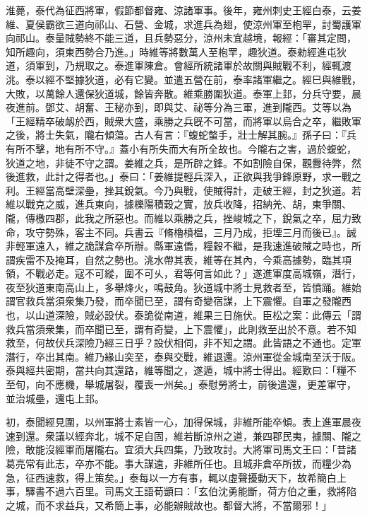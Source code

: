 \begin{pinyinscope}
淮薨，泰代為征西將軍，假節都督雍、涼諸軍事。後年，雍州刺史王經白泰，云姜維、夏侯霸欲三道向祁山、石營、金城，求進兵為翅，使涼州軍至枹䍐，討蜀護軍向祁山。泰量賊勢終不能三道，且兵勢惡分，涼州未宜越境，報經：「審其定問，知所趣向，須東西勢合乃進。」時維等將數萬人至枹䍐，趣狄道。泰勑經進屯狄道，須軍到，乃規取之。泰進軍陳倉。會經所統諸軍於故關與賊戰不利，經輒渡洮。泰以經不堅據狄道，必有它變。並遣五營在前，泰率諸軍繼之。經巳與維戰，大敗，以萬餘人還保狄道城，餘皆奔散。維乘勝圍狄道。泰軍上邽，分兵守要，晨夜進前。鄧艾、胡奮、王秘亦到，即與艾、祕等分為三軍，進到隴西。艾等以為「王經精卒破衂於西，賊衆大盛，乘勝之兵旣不可當，而將軍以烏合之卒，繼敗軍之後，將士失氣，隴右傾蕩。古人有言：『蝮蛇螫手，壯士解其腕。』孫子曰：『兵有所不擊，地有所不守。』蓋小有所失而大有所全故也。今隴右之害，過於蝮蛇，狄道之地，非徒不守之謂。姜維之兵，是所辟之鋒。不如割險自保，觀釁待弊，然後進救，此計之得者也。」泰曰：「姜維提輕兵深入，正欲與我爭鋒原野，求一戰之利。王經當高壁深壘，挫其銳氣。今乃與戰，使賊得計，走破王經，封之狄道。若維以戰克之威，進兵東向，據櫟陽積穀之實，放兵收降，招納羌、胡，東爭關、隴，傳檄四郡，此我之所惡也。而維以乘勝之兵，挫峻城之下，銳氣之卒，屈力致命，攻守勢殊，客主不同。兵書云『脩櫓橨榅，三月乃成，拒堙三月而後已』。誠非輕軍遠入，維之詭謀倉卒所辦。縣軍遠僑，糧穀不繼，是我速進破賊之時也，所謂疾雷不及掩耳，自然之勢也。洮水帶其表，維等在其內，今乘高據勢，臨其項領，不戰必走。寇不可縱，圍不可乆，君等何言如此？」遂進軍度高城嶺，潛行，夜至狄道東南高山上，多舉烽火，鳴鼓角。狄道城中將士見救者至，皆憤踊。維始謂官救兵當須衆集乃發，而卒聞已至，謂有奇變宿謀，上下震懼。自軍之發隴西也，以山道深險，賊必設伏。泰詭從南道，維果三日施伏。臣松之案：此傳云「謂救兵當須衆集，而卒聞已至，謂有奇變，上下震懼」，此則救至出於不意。若不知救至，何故伏兵深險乃經三日乎？設伏相伺，非不知之謂。此皆語之不通也。定軍潛行，卒出其南。維乃緣山突至，泰與交戰，維退還。涼州軍從金城南至沃于阪。泰與經共密期，當共向其還路，維等聞之，遂遁，城中將士得出。經歎曰：「糧不至旬，向不應機，舉城屠裂，覆喪一州矣。」泰慰勞將士，前後遣還，更差軍守，並治城壘，還屯上邽。

初，泰聞經見圍，以州軍將士素皆一心，加得保城，非維所能卒傾。表上進軍晨夜速到還。衆議以經奔北，城不足自固，維若斷涼州之道，兼四郡民夷，據關、隴之險，敢能沒經軍而屠隴右。宜須大兵四集，乃致攻討。大將軍司馬文王曰：「昔諸葛亮常有此志，卒亦不能。事大謀遠，非維所任也。且城非倉卒所拔，而糧少為急，征西速救，得上策矣。」泰每以一方有事，輒以虛聲擾動天下，故希簡白上事，驛書不過六百里。司馬文王語荀顗曰：「玄伯沈勇能斷，荷方伯之重，救將陷之城，而不求益兵，又希簡上事，必能辦賊故也。都督大將，不當爾邪！」


\end{pinyinscope}
